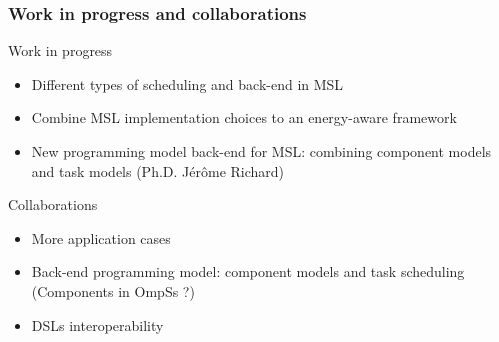 \documentclass{beamer}
\makeatletter
\newenvironment{withoutheadline}{
        \setbeamertemplate{headline}[default]
        \def\beamer@entrycode{\vspace*{-\headheight}}
    }{}
\makeatother
\begin{document}

\begin{frame}
\frametitle{Work in progress and collaborations}
\begin{block}{Work in progress}
\begin{itemize}
\item Different types of scheduling and back-end in MSL
\item Combine MSL implementation choices to an energy-aware framework
\item New programming model back-end for MSL: combining component models and task models (Ph.D. Jérôme Richard)
\end{itemize}
\end{block}
\begin{block}{Collaborations}
\begin{itemize}
\item More application cases
\item Back-end programming model: component models and task scheduling (Components in OmpSs ?)
\item DSLs interoperability
\end{itemize}
\end{block}
\end{frame}

\end{document}
